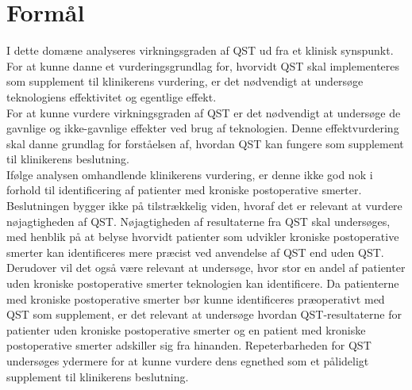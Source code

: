 \section{Formål}
I dette domæne analyseres virkningsgraden af QST ud fra et klinisk synspunkt. For at kunne danne et vurderingsgrundlag for, hvorvidt QST skal implementeres som supplement til klinikerens vurdering, er det nødvendigt at undersøge teknologiens effektivitet og egentlige effekt.\\
For at kunne vurdere virkningsgraden af QST er det nødvendigt at undersøge de gavnlige og ikke-gavnlige effekter ved brug af teknologien. Denne effektvurdering skal danne grundlag for forståelsen af, hvordan QST kan fungere som supplement til klinikerens beslutning. \\
Ifølge analysen omhandlende klinikerens vurdering, er denne ikke god nok i forhold til identificering af patienter med kroniske postoperative smerter. Beslutningen bygger ikke på tilstrækkelig viden, hvoraf det er relevant at vurdere nøjagtigheden af QST. Nøjagtigheden af resultaterne fra QST skal undersøges, med henblik på at belyse hvorvidt patienter som udvikler kroniske postoperative smerter kan identificeres mere præcist ved anvendelse af QST end uden QST. Derudover vil det også være relevant at undersøge, hvor stor en andel af patienter uden kroniske postoperative smerter teknologien kan identificere. Da patienterne med kroniske postoperative smerter bør kunne identificeres præoperativt med QST som supplement, er det relevant at undersøge hvordan QST-resultaterne for patienter uden kroniske postoperative smerter og en patient med kroniske postoperative smerter adskiller sig fra hinanden. Repeterbarheden for QST undersøges ydermere for at kunne vurdere dens egnethed som et pålideligt supplement til klinikerens beslutning.

